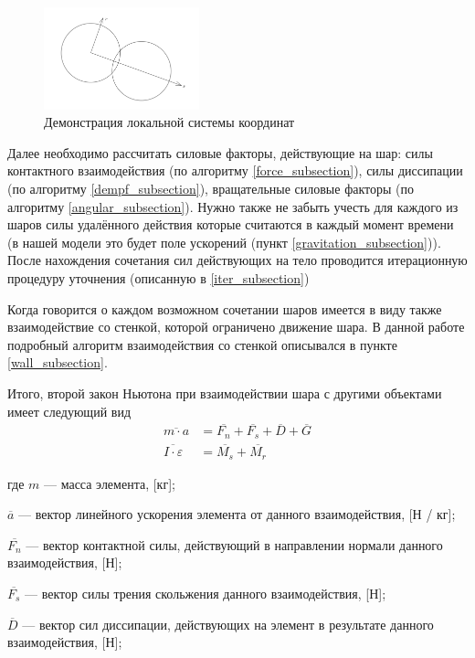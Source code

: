 \documentclass[a4paper]{article}
\begin{document}
\begin{figure}[h!]
	\centering
	\includegraphics[width=0.4\textwidth]{local}
	\caption{Демонстрация локальной системы координат}
	\label{pic:local}
\end{figure} 

Далее необходимо рассчитать силовые факторы, действующие на шар: силы контактного взаимодействия (по алгоритму \ref{force_subsection}), силы диссипации (по алгоритму \ref{dempf_subsection}), вращательные силовые факторы (по алгоритму \ref{angular_subsection}). 
Нужно также не забыть учесть для каждого из шаров силы удалённого действия которые считаются в каждый момент времени (в нашей модели это будет поле ускорений (пункт \ref{gravitation_subsection})). 
После нахождения сочетания сил действующих на тело проводится итерационную процедуру уточнения (описанную в \ref{iter_subsection})

Когда говорится о каждом возможном сочетании шаров имеется в виду также взаимодействие со стенкой, которой ограничено движение шара. 
В данной работе подробный алгоритм взаимодействия со стенкой описывался в пункте \ref{wall_subsection}.

Итого, второй закон Ньютона при взаимодействии шара с другими объектами имеет следующий вид
\begin{align}
\overline{m \cdot a} &= \overline{F_n} + \overline{F_s} + \overline{D} + \overline{G}\\
\overline{I \cdot \varepsilon} &= \overline{M_s} + \overline{M_r}
\end{align}

где $m$ --- масса элемента, [кг];

$\overline{a}$ --- вектор линейного ускорения элемента от данного взаимодействия, [Н / кг];

$\overline{F_n}$ --- вектор контактной силы, действующий в направлении нормали данного взаимодействия, [Н];

$\overline{F_s}$ --- вектор силы трения скольжения данного взаимодействия, [Н];

$ \overline{D}$ --- вектор сил диссипации, действующих на элемент в результате данного взаимодействия, [Н];
\end{document}
